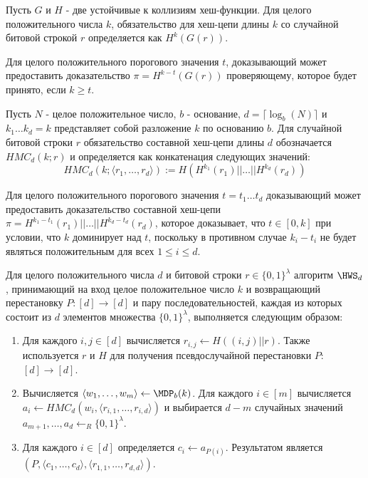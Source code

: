 \begin{definition}
Пусть $G$ и $H$ - две устойчивые к коллизиям хеш-функции.
Для целого положительного числа $k$, обязательство для хеш-цепи длины $k$ со случайной битовой строкой $r$ определяется как $H^k(G(r))$.
\end{definition}

\begin{definition}
Для целого положительного порогового значения $t$, доказывающий может предоставить доказательство $\pi = H^{k - t}(G(r))$ проверяющему, которое будет принято, если $k \geq t$.
\end{definition}

\begin{definition}
	Пусть $N$ - целое положительное число, $b$ - основание, $d = \lceil \log_b(N) \rceil$ и $k_1 \dots k_d = k$ представляет собой разложение $k$ по основанию $b$.
	Для случайной битовой строки $r$ обязательство составной хеш-цепи длины $d$ обозначается $HMC_d(k; r)$ и определяется как конкатенация следующих значений:
	$$
	HMC_d(k; \langle r_1, \dots, r_d \rangle) := H(H^{k_1}(r_1) || \dots || H^{k_d}(r_d))
	$$
\end{definition}

\begin{definition}
	Для целого положительного порогового значения $t = t_1 \dots t_d$ доказывающий может предоставить доказательство составной хеш-цепи $\pi = H^{k_1 - t_1}(r_1) || \dots || H^{k_d - t_d}(r_d)$, которое доказывает, что $t \in [0, k]$ при условии, что $k$ доминирует над $t$, поскольку в противном случае $k_i - t_i$ не будет являться положительным для всех $1 \leq i \leq d$.
\end{definition}

\begin{definition}[$\HWS_d$]
	Для целого положительного числа $d$ и битовой строки $r \in \{0, 1\}^\lambda$ алгоритм $\HWS_d$, принимающий на вход целое положительное число $k$ и возвращающий перестановку $P: [d] \rightarrow [d]$ и пару последовательностей, каждая из которых состоит из $d$ элементов множества $\{0, 1\}^\lambda$, выполняется следующим образом:
	\begin{enumerate}
		\item Для каждого $i, j \in [d]$ вычисляется $r_{i, j} \leftarrow H((i, j) || r)$. Также используется $r$ и $H$ для получения псевдослучайной перестановки $P$: $[d] \rightarrow [d]$.
		\item Вычисляется $\langle w_1, \dots, w_m \rangle \leftarrow \MDP_b(k)$. Для каждого $i \in [m]$ вычисляется $a_i \leftarrow HMC_d(w_i, \langle r_{i, 1}, \dots, r_{i, d} \rangle)$ и выбирается $d - m$ случайных значений $a_{m + 1}, \dots, a_d \leftarrow_R \{0, 1\}^\lambda$.
		\item Для каждого $i \in [d]$ определяется $c_i \leftarrow a_{P(i)}$. Результатом является $(P, \langle c_1, \dots, c_d \rangle, \langle r_{1, 1}, \dots, r_{d, d} \rangle)$.
	\end{enumerate}
\end{definition}

